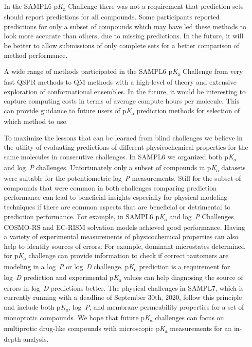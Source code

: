 \documentclass[9pt,lineno,final]{elife}
\newcommand{\pKa}{p\textit{K}\textsubscript{a}}
\newcommand{\logD}{log~\textit{D}}
\newcommand{\logP}{log~\textit{P}}
\begin{document}
In the SAMPL6 \pKa{} Challenge there was not a requirement that prediction sets should report predictions for all compounds. 
Some participants reported predictions for only a subset of compounds which may have led these methods to look more accurate than others, due to missing predictions.
In the future, it will be better to allow submissions of only complete sets for a better comparison of method performance. 

A wide range of methods participated in the SAMPL6 \pKa{} Challenge from very fast QSPR methods to QM methods with a high-level of theory and extensive exploration of conformational ensembles. In the future, it would be interesting to capture computing costs in terms of average compute hours per molecule. This can provide guidance to future users of \pKa{} prediction methods for selection of which method to use.

To maximize the lessons that can be learned from blind challenges we believe in the utility of evaluating predictions of different physicochemical properties for the same molecules in consecutive challenges. 
In SAMPL6 we organized both \pKa{} and \logP{} challenges. Unfortunately only a subset of compounds in \pKa{} datasets were suitable for the potentiometric \logP{} measurements. Still for the subset of compounds that were common in both challenges comparing prediction performance can lead to beneficial insights especially for physical modeling techniques if there are common aspects that are beneficial or detrimental to prediction performance. For example, in SAMPL6 \pKa{} and \logP{} Challenges COSMO-RS and EC-RISM solvation models achieved good performance.
Having a variety of experimental measurements of physicochemical properties can also help to identify sources of errors. For example, dominant microstates determined for \pKa{} challenge can provide information to check if correct tautomers are modeling in a \logP{} or \logD{} challenge.
\pKa{} prediction is a requirement for \logD{} prediction and experimental \pKa{} values can help diagnosing the source of errors in \logD{} predictions better. 
The physical challenges in SAMPL7, which is currently running with a deadline of September 30th, 2020, follow this principle and include both \pKa{}, \logP{}, and membrane permeability properties for a set of monoprotic compounds. 
We hope that future \pKa{} challenges can focus on multiprotic drug-like compounds with microscopic \pKa{} measurements for an in-depth analysis.
\end{document}
